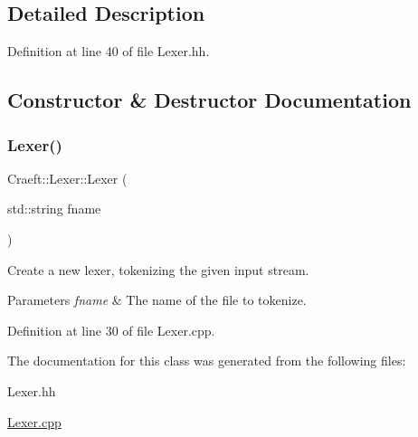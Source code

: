 \subsection{Detailed Description}


Definition at line 40 of file Lexer.\+hh.



\subsection{Constructor \& Destructor Documentation}
\hypertarget{class_craeft_1_1_lexer_a52dbd45faef58e7ea838d02cd7198037}{}\label{class_craeft_1_1_lexer_a52dbd45faef58e7ea838d02cd7198037} 
\subsubsection{\texorpdfstring{Lexer()}{Lexer()}}
{\footnotesize\ttfamily Craeft\+::\+Lexer\+::\+Lexer (\begin{DoxyParamCaption}\item[{std\+::string}]{fname }\end{DoxyParamCaption})}



Create a new lexer, tokenizing the given input stream. 


\begin{DoxyParams}{Parameters}
{\em fname} & The name of the file to tokenize. \\
\hline
\end{DoxyParams}


Definition at line 30 of file Lexer.\+cpp.



The documentation for this class was generated from the following files\+:\begin{DoxyCompactItemize}
\item 
Lexer.\+hh\item 
\hyperlink{_lexer_8cpp}{Lexer.\+cpp}\end{DoxyCompactItemize}
